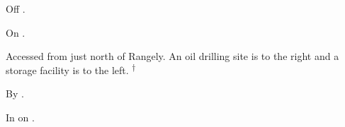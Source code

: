 
\begin{LocationList}

Off .

On .

Accessed from  just north of Rangely.
An oil drilling site is to the right and a storage facility is to the left.%
\textsuperscript{\scriptsize $\dagger$}

By .

\Location{\GasStation \Gas \Rest}
In  on .

\end{LocationList}
